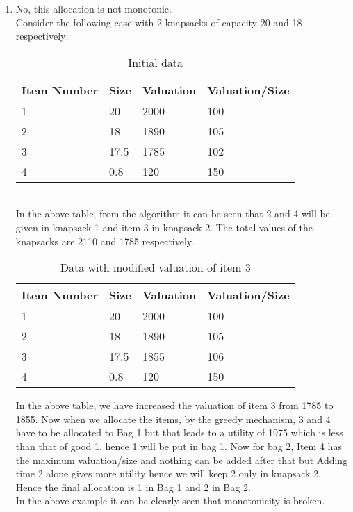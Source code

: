 \documentclass{article}
\begin{document}
\begin{enumerate}
\item %
	No, this allocation is not monotonic. \\
	Consider the following case with 2 knapsacks of capacity 20 and 18 respectively:
	\begin{table}[!htb]
\centering
\caption{Initial data}
\label{my-label}
\begin{tabular}{|l|l|l|l|}
\hline
Item Number & Size & Valuation & Valuation/Size \\ \hline
1           & 20   & 2000      & 100            \\ \hline
2           & 18   & 1890      & 105            \\ \hline
3           & 17.5 & 1785      & 102            \\ \hline
4           & 0.8  & 120       & 150            \\ \hline
\end{tabular}
\end{table}
\\ In the above table, from the algorithm it can be seen that 2 and 4 will be given in knapsack 1 and item 3 in knapsack 2. The total values of the knapsacks are 2110 and 1785 respectively.
\begin{table}[!htb]
\centering
\caption{Data with modified valuation of item 3}
\label{my-label}
\begin{tabular}{|l|l|l|l|}
\hline
Item Number & Size & Valuation & Valuation/Size \\ \hline
1           & 20   & 2000      & 100            \\ \hline
2           & 18   & 1890      & 105            \\ \hline
3           & 17.5 & 1855      & 106            \\ \hline
4           & 0.8  & 120       & 150            \\ \hline
\end{tabular}
\end{table}

In the above table, we have increased the valuation of item 3 from 1785 to 1855. Now when we allocate the items, by the greedy mechanism, 3 and 4 have to be allocated to Bag 1 but that leads
to a utility of 1975 which is less than that of good 1, hence 1 will be put in bag 1. Now for bag 2, Item 4 has the maximum valuation/size and nothing can be added after that but Adding time 2 alone
gives more utility hence we will keep 2 only in knapsack 2. Hence the final allocation is 1 in Bag 1 and 2 in Bag 2.
\\
In the above example it can be clearly seen that monotonicity is broken.


\end{enumerate}
\end{document}
